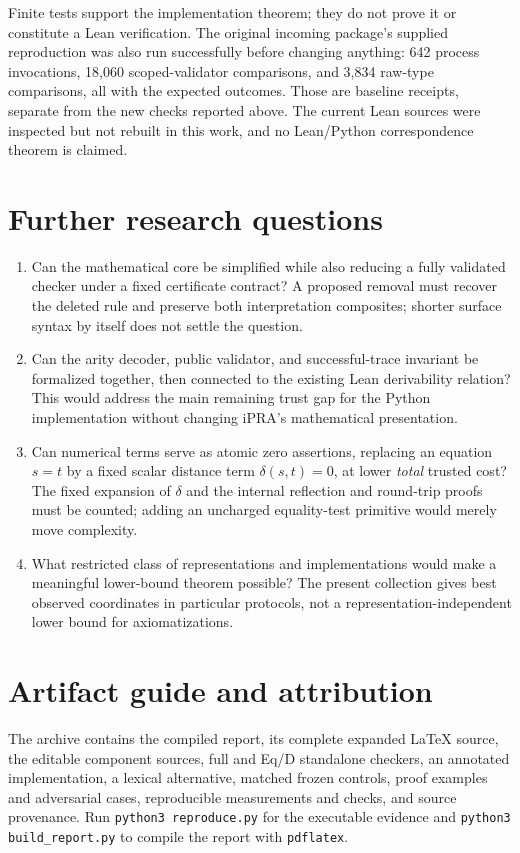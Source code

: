 \documentclass[11pt,letterpaper]{article}
\theoremstyle{definition}
\theoremstyle{remark}
\begin{document}
Finite tests support the implementation theorem; they do not prove it or
constitute a Lean verification. The original incoming package's supplied
reproduction was also run successfully before changing anything: 642 process
invocations, 18,060 scoped-validator comparisons, and 3,834 raw-type
comparisons, all with the expected outcomes. Those are baseline receipts,
separate from the new checks reported above. The current Lean sources were
inspected but not rebuilt in this work, and no Lean/Python correspondence
theorem is claimed.

\Needspace{240pt}
\section{Further research questions}
\label{sec:further}
\begin{enumerate}
\item Can the mathematical core be simplified while also reducing a fully
validated checker under a fixed certificate contract? A proposed removal
must recover the deleted rule and preserve both interpretation composites;
shorter surface syntax by itself does not settle the question.
\item Can the arity decoder, public validator, and successful-trace invariant
be formalized together, then connected to the existing Lean derivability
relation? This would address the main remaining trust gap for the Python
implementation without changing iPRA's mathematical presentation.
\item Can numerical terms serve as atomic zero assertions, replacing an
equation $s=t$ by a fixed scalar distance term $\delta(s,t)=0$, at lower
\emph{total} trusted cost? The fixed expansion of $\delta$ and the internal
reflection and round-trip proofs must be counted; adding an uncharged
equality-test primitive would merely move complexity.
\item What restricted class of representations and implementations would
make a meaningful lower-bound theorem possible? The present collection
gives best observed coordinates in particular protocols, not a
representation-independent lower bound for axiomatizations.
\end{enumerate}

\section*{Artifact guide and attribution}
The archive contains the compiled report, its complete expanded LaTeX source,
the editable component sources, full and Eq/D standalone checkers, an annotated
implementation, a lexical alternative, matched frozen controls,
proof examples and adversarial cases, reproducible measurements and checks,
and source provenance. Run \texttt{python3 reproduce.py} for the executable
evidence and \texttt{python3 build\_report.py} to compile the report with
\texttt{pdflatex}.
\end{document}
